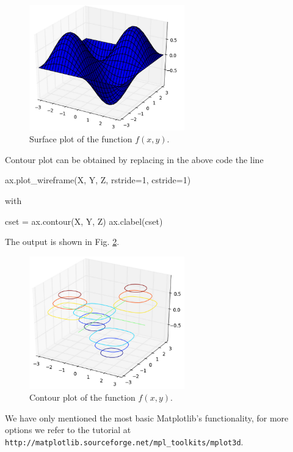 \begin{figure}[!ht]
\begin{center}
\includegraphics[width=0.6\textwidth]{imgp/plot3d-3.png}
\end{center}
\vspace{-4mm}
\caption{Surface plot of the function $f(x, y)$.}
\label{fig:plot3d-3}
\end{figure}
\newpage

\noindent
Contour plot can be obtained by replacing in the above code 
the line 

\begin{bluecode}
ax.plot_wireframe(X, Y, Z, rstride=1, cstride=1)
\end{bluecode}
with 

\begin{bluecode}
cset = ax.contour(X, Y, Z)
ax.clabel(cset)
\end{bluecode}
The output is shown in Fig. \ref{fig:plot3d-4}.

\begin{figure}[!ht]
\begin{center}
\includegraphics[width=0.6\textwidth]{imgp/plot3d-4.png}
\end{center}
\vspace{-4mm}
\caption{Contour plot of the function $f(x, y)$.}
\label{fig:plot3d-4}
\end{figure}
\noindent
We have only mentioned the most basic Matplotlib's functionality, for more options 
we refer to the tutorial 
at {\tt http://matplotlib.sourceforge.net/mpl\_toolkits/mplot3d}.


